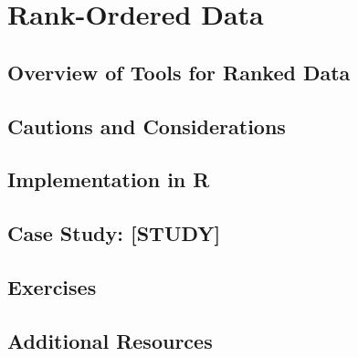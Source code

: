 
\chapter{Rank-Ordered Data}

\section{Overview of Tools for Ranked Data}

\section{Cautions and Considerations}

\section{Implementation in R}

\section{Case Study: [STUDY]}

\section{Exercises}

\section{Additional Resources}
